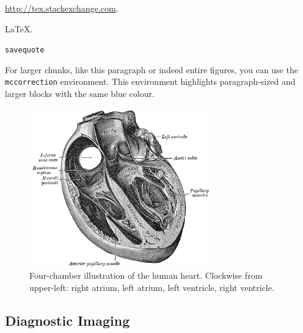 \url{http://tex.stackexchange.com}.

\LaTeX. 

\newcommand{\ISb}[1]{\makebox[0pt]{{#1}}} 
\newcommand{\ISc}[1]{\makebox[0pt]{\raisebox{-0.5\height}{#1}}}
\newcommand{\ISt}[1]{\makebox[0pt]{\raisebox{-\height}{#1}}}
\newcommand{\yticks}[1]{\makebox[0pt][r]{\raisebox{-0.5\height}{#1}\hspace*{1.8mm}}}
\newcommand{\ylabel}[1]{\makebox[0pt][r]{\raisebox{-0.5\height}{#1}\hspace*{6.7mm}}}
\newcommand{\xticks}[1]{\makebox[0pt][c]{\raisebox{-3.8mm}{#1}}}
\newcommand{\xlabel}[1]{\makebox[0pt][c]{\raisebox{-7.0mm}{#1}}}
\newcommand{\lticks}[1]{\makebox[0pt][l]{\hspace*{2.0mm}\raisebox{-0.5\height}{#1}}}

\newcommand{\sftl}[1]{\makebox[0pt][l]{\hspace*{0.8mm}\raisebox{-3.2mm}{#1}}} %
\newcommand{\sftr}[1]{\makebox[0pt][l]{\hspace*{-6.0mm}\raisebox{-3.2mm}{#1}}} %


\verb|savequote| 


\begin{mccorrection}
For larger chunks, like this paragraph or indeed entire figures, you can use the \verb|mccorrection| environment.  This environment highlights paragraph-sized and larger blocks with the same blue colour.
\end{mccorrection}

\begin{figure}
\centering\includegraphics[width=0.7\textwidth]{figures/sample/Gray498.png} 
\caption[Four-chamber illustration of the human heart.]{Four-chamber illustration of the human heart.  Clockwise from upper-left: right atrium, left atrium, left ventricle, right ventricle.}
\label{fig:fourchamber}
\end{figure}

\subsection{Diagnostic Imaging}
\label{sub:diagnostic}
